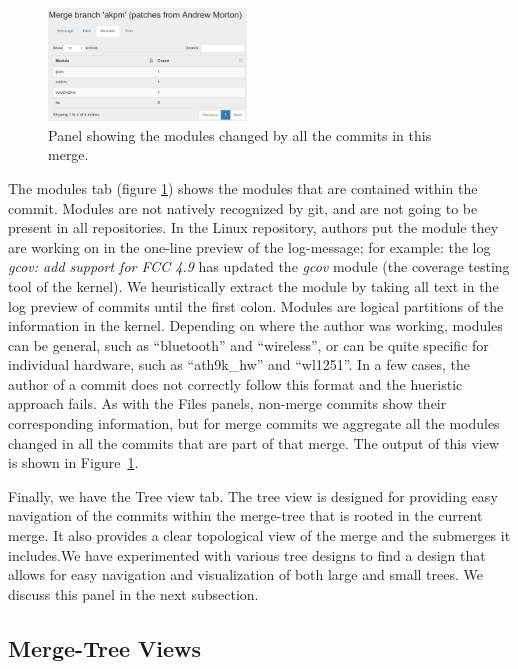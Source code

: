 \documentclass[conference, draftclsnofoot, draft]{IEEEtran}
\begin{document}
\begin{figure}
        \centering
        \includegraphics[width=0.47\textwidth]{figures/modules_view_2.png}
        \caption{Panel showing the modules changed by all the commits in this merge.}
        \label{fig:modules}
\end{figure}

The modules tab (figure \ref{fig:modules}) shows the modules that are contained
within the commit. Modules are not natively recognized by git, and are not going to
be present in all repositories.  In the Linux repository, authors put the module
they are working on in the one-line preview of the log-message; for example: the log \emph{gcov: add support for FCC 4.9} has updated the \emph{gcov} module
(the coverage testing tool of the kernel). We heuristically
extract the module by taking all text in the log preview of commits until the first
colon.  Modules are logical partitions of the information in the kernel. Depending
on where the author was working, modules can be general, such as ``bluetooth'' and
``wireless'', or can be quite specific for individual hardware, such as
``ath9k\_hw'' and ``wl1251''. In a few cases, the author of a commit does not
correctly follow this format and the hueristic approach fails. As with the Files panels,
non-merge commits show their corresponding information, but for merge commits we aggregate all the modules changed
in all the commits that are part of that merge.
The output of this view is shown in Figure~\ref{fig:modules}.

Finally, we have the Tree view tab. The tree view is designed for providing easy
navigation of the commits within the merge-tree that is rooted in the current merge. It also provides a clear topological view of the merge and the submerges it includes.We have experimented with various tree designs to find a design that
allows for easy navigation and visualization of both large and small trees.  We discuss this panel in the next subsection.

\subsection{Merge-Tree Views} \label{treeview_section}
\end{document}
